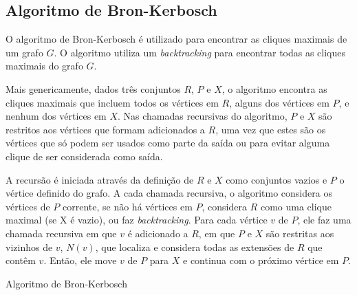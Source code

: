 \documentclass{article}
\begin{document}
\subsection{Algoritmo de Bron-Kerbosch}

O algoritmo de Bron-Kerbosch é utilizado
para encontrar as cliques maximais de um grafo $G$. O algoritmo utiliza um
\textit{backtracking}  para encontrar
todas as cliques maximais do grafo $G$.

Mais genericamente, dados três conjuntos $R$, $P$ e $X$, o algoritmo encontra
as cliques maximais que incluem todos os vértices em $R$, alguns dos vértices
em $P$, e nenhum dos vértices em $X$. Nas chamadas recursivas do algoritmo, $P$
e $X$ são restritos aos vértices que formam adicionados a $R$, uma vez que
estes são os vértices que só podem ser usados como parte da saída ou para
evitar alguma clique de ser considerada como saída.


A recursão é iniciada através da definição de $R$ e $X$ como
conjuntos vazios e $P$ o vértice definido do grafo. A cada chamada recursiva,
o algoritmo considera os vértices de $P$ corrente, se não há
vértices em $P$, considera $R$ como uma clique maximal (se X é vazio), ou faz
\textit{backtracking}. Para cada vértice $v$ de $P$, ele
faz uma chamada recursiva em que $v$ é adicionado a $R$, em que $P$ e $X$ são
restritas aos vizinhos de $v$, $N(v)$, que localiza e considera todas as
extensões de $R$ que contêm $v$. Então, ele move $v$ de $P$ para $X$ e continua
com o próximo vértice em $P$.



\begin{algorithm}
    \caption{Algoritmo de Bron-Kerbosch}
    \label{alg:bronkerbosch}
    
    \begin{algorithmic}
    
    \ENDIF
    
     \ENDFOR
    
    \end{algorithmic}
\end{algorithm}
\end{document}

